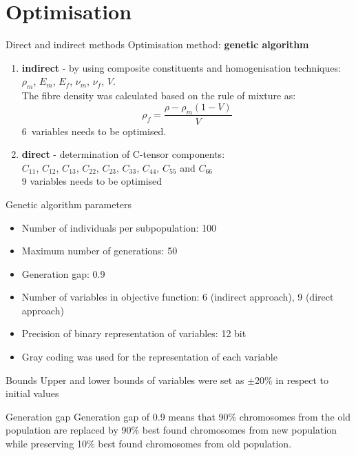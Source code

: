 \documentclass[10pt]{beamer} %
\begin{document}


\section{Optimisation}
\begin{frame}[t,label=frame21]{Direct and indirect methods}
Optimisation method: \textbf{genetic algorithm}
\begin{enumerate}
	\item \textbf{indirect} - by using composite constituents and homogenisation techniques:\\
	 $\rho_m$,  $E_m$,  $E_f$, $\nu_m$,  $\nu_f$,  $V$.  \\
	 The fibre density was calculated based on the rule of mixture as:
	\begin{equation*}
	\rho_f = \frac{\rho - \rho_m (1-V)}{V}
	\end{equation*}
	\vspace{10pt}
	 \alert{6~variables} needs to be optimised.
	\item \textbf{direct} - determination of C-tensor components:\\
	 $C_{11}$, $C_{12}$, $C_{13}$,  $C_{22}$, $C_{23}$, $C_{33}$, $C_{44}$, $C_{55}$ and $C_{66}$\\
	 \vspace{10pt}
	  \alert{9 variables} needs to be optimised
\end{enumerate}
\end{frame}


\begin{frame}[t,label=frame24]{Genetic algorithm parameters}
\begin{itemize}
	\item Number of individuals per subpopulation: 100
	\item Maximum number of generations: 50
	\item Generation gap: 0.9
	\item Number of variables in objective function: 6 (indirect approach), 9 (direct approach)
	\item Precision of binary representation of variables: 12 bit
	\item Gray coding was used for the representation of each variable
\end{itemize}
\vspace{6pt}
\begin{alertblock}{Bounds}
	Upper and lower bounds of variables were set as  $\pm$20\% in respect to initial values
\end{alertblock}
\begin{block}{Generation gap}
	 Generation gap of 0.9 means that 90\% chromosomes from the old population are replaced by 90\% best found chromosomes from new population while preserving 10\% best found chromosomes from old population.
\end{block}
\end{frame}
\end{document}
